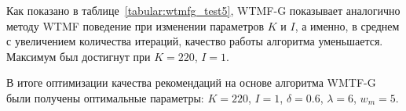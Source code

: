     Как показано в таблице~\ref{tabular:wtmfg_test5}, WTMF-G показывает аналогично методу WTMF поведение при изменении параметров $K$ и $I$, а именно, в среднем с увеличением количества итераций, качество работы алгоритма уменьшается.
    Максимум был достигнут при $K=220$, $I=1$.

    В итоге оптимизации качества рекомендаций на основе алгоритма WMTF-G были получены оптимальные параметры:
    $K=220$, $I=1$, $\delta=0.6$, $\lambda=6$, $w_m=5$.

    \clearpage